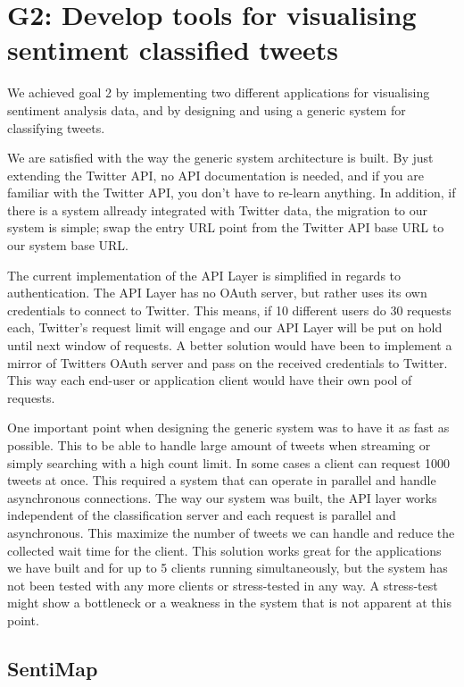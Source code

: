 \section{G2: Develop tools for visualising sentiment classified tweets}

We achieved goal 2 by implementing two different applications for visualising sentiment analysis data, and by designing and using a generic system for classifying tweets. 

We are satisfied with the way the generic system architecture is built. By just extending the Twitter API, no API documentation is needed, and if you are familiar with the Twitter API, you don't have to re-learn anything. In addition, if there is a system allready integrated with Twitter data, the migration to our system is simple; swap the entry URL point from the Twitter API base URL to our system base URL. 

The current implementation of the API Layer is simplified in regards to authentication. The API Layer has no OAuth server, but rather uses its own credentials to connect to Twitter. This means, if 10 different users do 30 requests each, Twitter's request limit will engage and our API Layer will be put on hold until next window of requests. A better solution would have been to implement a mirror of Twitters OAuth server and pass on the received credentials to Twitter. This way each end-user or application client would have their own pool of requests. 

One important point when designing the generic system was to have it as fast as possible. This to be able to handle large amount of tweets when streaming or simply searching with a high count limit. In some cases a client can request 1000 tweets at once. This required a system that can operate in parallel and handle asynchronous connections. The way our system was built, the API layer works independent of the classification server and each request is parallel and asynchronous. This maximize the number of tweets we can handle and reduce the collected wait time for the client. This solution works great for the applications we have built and for up to 5 clients running simultaneously, but the system has not been tested with any more clients or stress-tested in any way. A stress-test might show a bottleneck or a weakness in the system that is not apparent at this point. 

\subsection{SentiMap}

